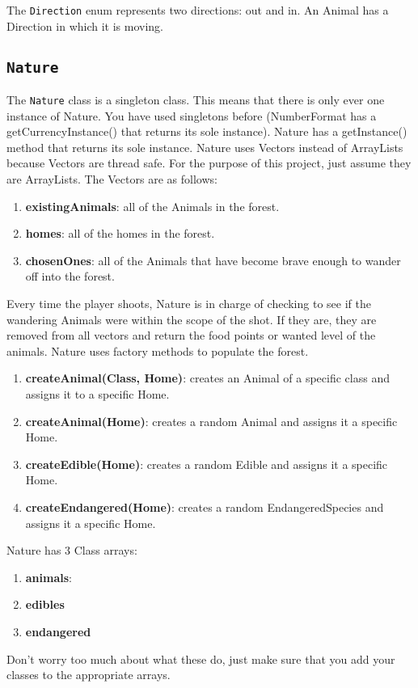 \documentclass[12pt]{article}
\begin{document}
The {\tt Direction} enum represents two directions: out and in.  An Animal has a Direction in which it is moving.

\subsection{{\tt Nature}}

The {\tt Nature} class is a singleton class.  This means that there is only ever one instance of Nature.  You have used singletons before (NumberFormat has a getCurrencyInstance() that returns its sole instance).  Nature has a getInstance() method that returns its sole instance.  
Nature uses Vectors instead of ArrayLists because Vectors are thread safe.  For the purpose of this project, just assume they are ArrayLists.
The Vectors are as follows:
\begin{enumerate}
    \item {\bf {existingAnimals}}:  all of the Animals in the forest.
    \item {\bf {homes}}:  all of the homes in the forest.
    \item {\bf {chosenOnes}}:  all of the Animals that have become brave enough to wander off into the forest.
    \end{enumerate}
Every time the player shoots, Nature is in charge of checking to see if the wandering Animals were within the scope of the shot.  If they are, they are removed from all vectors and return the food points or wanted level of the animals.
Nature uses factory methods to populate the forest.  
\begin{enumerate}
    \item {\bf {createAnimal(Class, Home)}}: creates an Animal of a specific class and assigns it to a specific Home.
    \item {\bf {createAnimal(Home)}}: creates a random Animal and assigns it a specific Home.
    \item {\bf {createEdible(Home)}}: creates a random Edible and assigns it a specific Home.
    \item {\bf {createEndangered(Home)}}: creates a random EndangeredSpecies and assigns it a specific Home.
    \end{enumerate}

Nature has 3 Class arrays:
\begin{enumerate}
    \item {\bf {animals}}: 
    \item {\bf {edibles}}
    \item {\bf {endangered}}
    \end{enumerate}
Don't worry too much about what these do, just make sure that you add your classes to the appropriate arrays.
\end{document}
